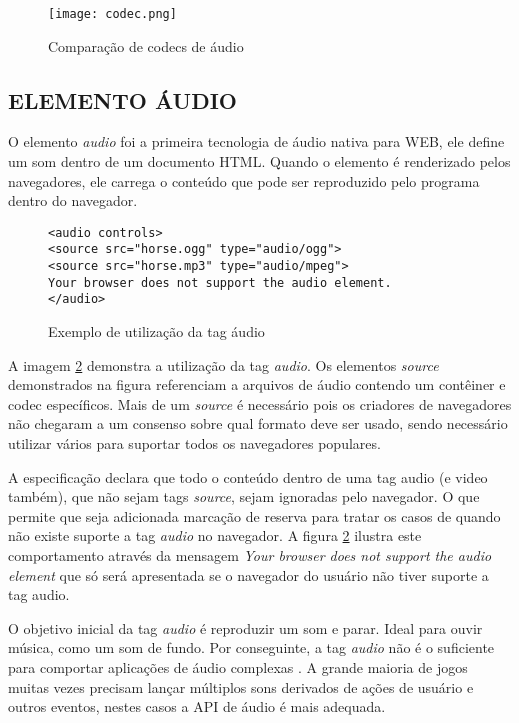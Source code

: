 \begin{figure}
    \centering
    \texttt{[image: codec.png]}
	\caption{Comparação de codecs de áudio}
    \label{fig:audioCodecs}
\end{figure}

\subsection{ELEMENTO ÁUDIO}

O elemento \textit{audio} foi a primeira tecnologia de áudio nativa para
WEB, ele define um som dentro de um documento HTML. Quando o elemento
é renderizado pelos navegadores, ele carrega o conteúdo que pode ser
reproduzido pelo programa dentro do navegador.

\begin{figure}
\centering
\begin{verbatim}
<audio controls>
<source src="horse.ogg" type="audio/ogg">
<source src="horse.mp3" type="audio/mpeg">
Your browser does not support the audio element.
</audio>
\end{verbatim}
\caption{Exemplo de utilização da tag áudio}
\label{fig:htmlAudio}
\end{figure}

A imagem \ref{fig:htmlAudio} demonstra a utilização da tag
\textit{audio}. Os elementos \textit{source} demonstrados na figura
referenciam a arquivos de áudio contendo um contêiner e codec
específicos. Mais de um \textit{source } é necessário pois 
os criadores de navegadores não chegaram a um consenso sobre 
qual formato deve ser usado, sendo necessário utilizar vários para suportar
todos os navegadores populares.

A especificação declara que todo o conteúdo dentro de uma tag audio
(e video também), que não sejam tags \textit{source}, sejam ignoradas
pelo navegador. O que permite que seja adicionada marcação de reserva
para tratar os casos de quando não existe suporte a tag \textit{audio}
no navegador. A figura \ref{fig:htmlAudio} ilustra este comportamento 
através da mensagem \textit{Your browser does not support the audio element
} que só será apresentada se o navegador do usuário não tiver suporte
a tag audio.

O objetivo inicial da tag \textit{audio} é reproduzir um som e parar.
Ideal para ouvir música, como um som de fundo. Por conseguinte, a tag
\textit{audio} não é o suficiente para comportar aplicações de
áudio complexas \autocite{audioApiSpec}. A grande maioria de jogos
muitas vezes precisam lançar múltiplos sons derivados de ações
de usuário e outros eventos, nestes casos a API de áudio é mais
adequada.

